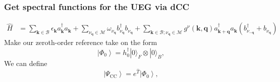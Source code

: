 \begin{frame}
    \frametitle{Get spectral functions for the UEG via dCC}
\begin{align}
\hat{H}
&= \sum_{{\bm{k}}\in \mathcal{B}} \epsilon_{{\bm{k}}} a_{{\bm{k}}}^{\dagger} a_{{\bm{k}}} + \sum_{\nu_{\bm{q}}\in \mathcal{M}} \omega_{\nu_{\bm{q}}} b_{\nu_{\bm{q}}}^{\dagger} b_{\nu_{\bm{q}}} + \sum_{{\bm{k}}\in \mathcal{B} ; \nu_{\bm{q}}\in \mathcal{M}}g^\nu(\mathbf{k}, \mathbf{q}) a_{{\mathbf{k}+\mathbf{q}}}^{\dagger} a_{{\mathbf{k}}}\left(b_{\nu_{-\mathbf{q}}}^{\dagger}+b_{\nu_{\mathbf{q}}}\right)
\end{align}\pause
Make our zeroth-order reference take on the form
\begin{equation}
    \left|\Phi_0\right\rangle=h_{0}^{\dagger}|0\rangle_{F} \otimes|0\rangle_{B},
\end{equation}
We can define 
\begin{equation}
    \left|\Psi_{\mathrm{CC}}\right\rangle = e^{\hat{T}} \left|\Phi_0\right\rangle,
\end{equation}
\end{frame}
